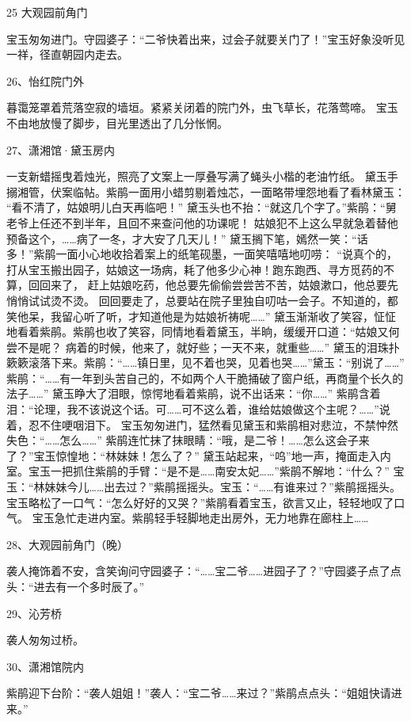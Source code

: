 25 大观园前角门\par
宝玉匆匆进门。守园婆子：“二爷快着出来，过会子就要关门了！”宝玉好象没听见一祥，径直朝园内走去。

26、怡红院门外\par
暮霭笼罩着荒落空寂的墙垣。紧紧关闭着的院门外，虫飞草长，花落莺啼。
宝玉不由地放慢了脚步，目光里透出了几分怅惘。

27、潇湘馆·黛玉房内\par
一支新蜡摇曳着烛光，照亮了文案上一厚叠写满了蝇头小楷的老油竹纸。
黛玉手搦湘管，伏案临帖。紫鹃一面用小蜡剪剔着烛芯，一面略带埋怨地看了看林黛玉：
“看不清了，姑娘明儿白天再临吧！”
黛玉头也不抬：“就这几个字了。”紫鹃：“舅老爷上任还不到半年，且回不来查问他的功课呢！
姑娘犯不上这么早就急着替他预备这个，……病了一冬，才大安了几天儿！”
黛玉搁下笔，嫣然一笑：“话多！”紫鹃一面小心地收拾着案上的纸笔砚墨，一面笑嘻嘻地叨唠：
“说真个的，打从宝玉搬出园子，姑娘这一场病，耗了他多少心神！跑东跑西、寻方觅药的不算，回回来了，
赶上姑娘吃药，他总要先偷偷尝尝苦不苦，姑娘漱口，他总要先悄悄试试烫不烫。
回回要走了，总要站在院子里独自叨咕一会子。不知道的，都笑他呆，我留心听了听，才知道他是为姑娘祈祷呢……”
黛玉渐渐收了笑容，怔怔地看着紫鹃。紫鹃也收了笑容，同情地看着黛玉，半晌，缓缓开口道：“姑娘又何尝不是呢？
病着的时候，他来了，就好些；一天不来，就重些……”
黛玉的泪珠扑簌簌滚落下来。紫鹃：“……镇日里，见不着也哭，见着也哭……”黛玉：“别说了……”
紫鹃：“……有一年到头苦自己的，不如两个人干脆捅破了窗户纸，再商量个长久的法子……”
黛玉睁大了泪眼，惊愕地看着紫鹃，说不出话来：“你……”
紫鹃含着泪：“论理，我不该说这个话。可……可不这么着，谁给姑娘做这个主呢？……”说着，忍不住哽咽泪下。
宝玉匆匆进门，猛然看见黛玉和紫鹃相对悲泣，不禁忡然失色：“……怎么……”
紫鹃连忙抹了抹眼睛：“哦，是二爷！……怎么这会子来了？”宝玉惊惶地：“林妹妹！怎么了？”
黛玉站起来，“呜”地一声，掩面走入内室。宝玉一把抓住紫鹃的手臂：“是不是……南安太妃……”紫鹃不解地：“什么？”
宝玉：“林妹妹今儿……出去过？”紫鹃摇摇头。宝玉：“……有谁来过？”紫鹃摇摇头。
宝玉略松了一口气：“怎么好好的又哭？”紫鹃看着宝玉，欲言又止，轻轻地叹了口气。
宝玉急忙走进内室。紫鹃轻手轻脚地走出房外，无力地靠在廊柱上……

28、大观园前角门（晚）\par
袭人掩饰着不安，含笑询问守园婆子：“……宝二爷……进园子了？”守园婆子点了点头：“进去有一个多时辰了。”

29、沁芳桥\par
袭人匆匆过桥。

30、潇湘馆院内\par
紫鹃迎下台阶：“袭人姐姐！”袭人：“宝二爷……来过？”紫鹃点点头：“姐姐快请进来。”

